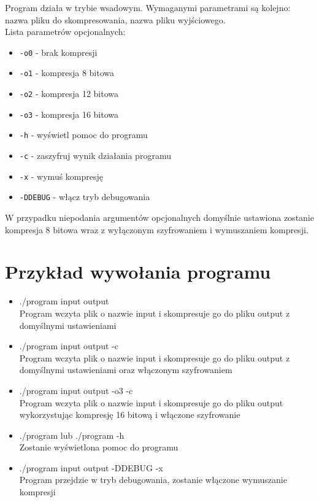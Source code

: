 \documentclass[]{article}
\begin{document}
Program działa w trybie wsadowym. Wymaganymi parametrami są kolejno: nazwa pliku do skompresowania, nazwa pliku wyjściowego.
\\Lista parametrów opcjonalnych:

\begin{itemize}
\item
  \texttt{-o0} - brak kompresji
\item
   \texttt{-o1} - kompresja 8 bitowa
\item
   \texttt{-o2} - kompresja 12 bitowa
\item
   \texttt{-o3} - kompresja 16 bitowa
\item
 \texttt{-h} - wyświetl pomoc do programu
\item
 \texttt{-c} - zaszyfruj wynik działania programu
\item
 \texttt{-x} - wymuś kompresję
\item
 \texttt{-DDEBUG} - włącz tryb debugowania
\end{itemize}
W przypadku niepodania argumentów opcjonalnych domyślnie ustawiona zostanie kompresja 8 bitowa wraz z wyłączonym szyfrowaniem i wymuszaniem kompresji.

\section{Przykład wywołania programu}\label{header-n233}

\begin{itemize}
\item
 ./program input output
\\Program wczyta plik o nazwie input i skompresuje go do pliku output z domyślnymi ustawieniami
\item
 ./program input output -c
\\Program wczyta plik o nazwie input i skompresuje go do pliku output z domyślnymi ustawieniami oraz włączonym szyfrowaniem
\item
 ./program input output -o3 -c
\\Program wczyta plik o nazwie input i skompresuje go do pliku output wykorzystując kompresję 16 bitową i włączone szyfrowanie 
\item
 ./program lub ./program -h
\\Zostanie wyświetlona pomoc do programu
\item
 ./program input output -DDEBUG -x
\\Program przejdzie w tryb debugowania, zostanie włączone wymuszanie kompresji

\end{itemize}
\end{document}
